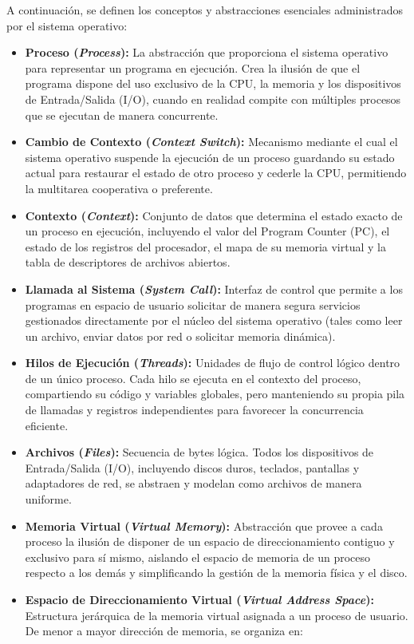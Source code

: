 \documentclass[11pt, a4paper]{article}
\begin{document}
A continuación, se definen los conceptos y abstracciones esenciales administrados por el sistema operativo:
\begin{itemize}
  \item \textbf{Proceso (\textit{Process}):} La abstracción que proporciona el sistema operativo para representar un programa en ejecución. Crea la ilusión de que el programa dispone del uso exclusivo de la CPU, la memoria y los dispositivos de Entrada/Salida (I/O), cuando en realidad compite con múltiples procesos que se ejecutan de manera concurrente.
  \item \textbf{Cambio de Contexto (\textit{Context Switch}):} Mecanismo mediante el cual el sistema operativo suspende la ejecución de un proceso guardando su estado actual para restaurar el estado de otro proceso y cederle la CPU, permitiendo la multitarea cooperativa o preferente.
  \item \textbf{Contexto (\textit{Context}):} Conjunto de datos que determina el estado exacto de un proceso en ejecución, incluyendo el valor del Program Counter (PC), el estado de los registros del procesador, el mapa de su memoria virtual y la tabla de descriptores de archivos abiertos.
  \item \textbf{Llamada al Sistema (\textit{System Call}):} Interfaz de control que permite a los programas en espacio de usuario solicitar de manera segura servicios gestionados directamente por el núcleo del sistema operativo (tales como leer un archivo, enviar datos por red o solicitar memoria dinámica).
  \item \textbf{Hilos de Ejecución (\textit{Threads}):} Unidades de flujo de control lógico dentro de un único proceso. Cada hilo se ejecuta en el contexto del proceso, compartiendo su código y variables globales, pero manteniendo su propia pila de llamadas y registros independientes para favorecer la concurrencia eficiente.
  \item \textbf{Archivos (\textit{Files}):} Secuencia de bytes lógica. Todos los dispositivos de Entrada/Salida (I/O), incluyendo discos duros, teclados, pantallas y adaptadores de red, se abstraen y modelan como archivos de manera uniforme.
  \item \textbf{Memoria Virtual (\textit{Virtual Memory}):} Abstracción que provee a cada proceso la ilusión de disponer de un espacio de direccionamiento contiguo y exclusivo para sí mismo, aislando el espacio de memoria de un proceso respecto a los demás y simplificando la gestión de la memoria física y el disco.
  \item \textbf{Espacio de Direccionamiento Virtual (\textit{Virtual Address Space}):} Estructura jerárquica de la memoria virtual asignada a un proceso de usuario. De menor a mayor dirección de memoria, se organiza en:

\end{itemize}
\end{document}
